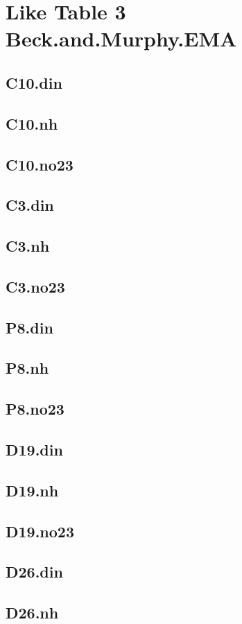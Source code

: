 \documentclass[12pt]{amsart}
\begin{document}
\section{Like Table 3 Beck.and.Murphy.EMA}

\subsection{C10.din}
\subsection{C10.nh}
\subsection{C10.no23}
\subsection{C3.din}
\subsection{C3.nh}
\subsection{C3.no23}
\subsection{P8.din}
\subsection{P8.nh}
\subsection{P8.no23}
\subsection{D19.din}
\subsection{D19.nh}
\subsection{D19.no23}
\subsection{D26.din}
\subsection{D26.nh}
\end{document}
